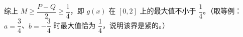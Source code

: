 \begin{answer}
综上 \(M\geqslant\dfrac{P-Q}{2}\geqslant\dfrac{1}{4}\)，即 \(g(x)\) 在 \([0,2]\) 上的最大值不小于 \(\dfrac{1}{4}\)。（取等例：\(a=\dfrac{3}{4}\)、\(b=-\dfrac{3}{4}\) 时最大值恰为 \(\dfrac{1}{4}\)，说明该界是紧的。）

\gkanswer{答案（1）：\(a\leqslant0\) 时在 \(\mathbf{R}\) 上单调递增；\(a>0\) 时在 \((-\infty,1-\sqrt{\frac{a}{3}}]\)、\([1+\sqrt{\frac{a}{3}},+\infty)\) 上递增，在 \([1-\sqrt{\frac{a}{3}},1+\sqrt{\frac{a}{3}}]\) 上递减。}



\end{answer}